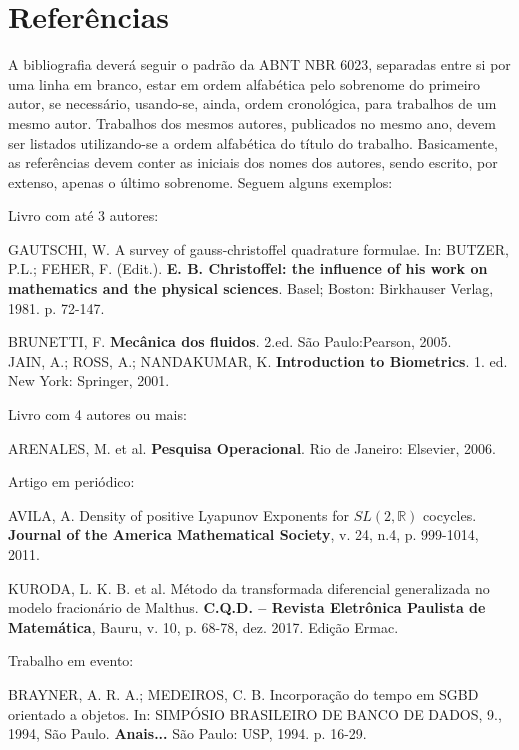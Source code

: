 \documentclass[a4paper,11pt]{article}
\begin{document}
\section*{Referências}
A bibliografia deverá seguir o padrão da ABNT NBR 6023, separadas entre si por uma linha em branco, estar em ordem alfabética pelo sobrenome do primeiro autor, se necessário, usando-se, ainda, ordem cronológica, para trabalhos de um mesmo autor. Trabalhos dos mesmos autores, publicados no mesmo ano, devem ser listados utilizando-se a ordem alfabética do título do trabalho. Basicamente, as referências devem conter as iniciais dos nomes dos autores, sendo escrito, por extenso, apenas o último sobrenome. Seguem alguns exemplos:

\vskip 0.5cm
\begin{flushleft}

{\color{red} Livro com até 3 autores:}

GAUTSCHI, W. A survey of gauss-christoffel quadrature formulae. In: BUTZER, P.L.; FEHER, F. (Edit.). {\bf E. B. Christoffel: the influence of his work on mathematics and the physical sciences}. Basel; Boston: Birkhauser Verlag, 1981. p. 72-147.

\vskip 0.2cm
BRUNETTI, F. \textbf{Mecânica dos fluidos}. 2.ed. São Paulo:Pearson, 2005.\\
\vskip 0.2cm
JAIN, A.; ROSS, A.; NANDAKUMAR, K. \textbf{Introduction to Biometrics}. 1. ed. New York: Springer, 2001.

\vskip 0.4cm
{\color{red}Livro com 4 autores ou mais:}

ARENALES, M. et al. \textbf{Pesquisa Operacional}. Rio de Janeiro: Elsevier, 2006.

\vskip 0.4cm
{\color{red}Artigo em periódico:}

AVILA, A. Density of positive Lyapunov Exponents for $SL(2,\mathbb{R})$ cocycles. \textbf{Journal of the America Mathematical Society}, v. 24, n.4, p. 999-1014, 2011.

\vskip 0.4cm

KURODA, L. K. B. et al. Método da transformada diferencial generalizada no modelo fracionário de Malthus. \textbf{C.Q.D. -- Revista Eletrônica Paulista de Matemática}, Bauru, v. 10, p. 68-78, dez. 2017. Edição Ermac. 

\vskip 0.4cm
{\color{red}Trabalho em evento:}

BRAYNER, A. R. A.; MEDEIROS, C. B. Incorporação do tempo em SGBD orientado a objetos. In: SIMPÓSIO BRASILEIRO DE BANCO DE DADOS, 9., 1994, São Paulo. \textbf{Anais...} São Paulo: USP, 1994. p. 16-29.


\end{flushleft}
\end{document}
